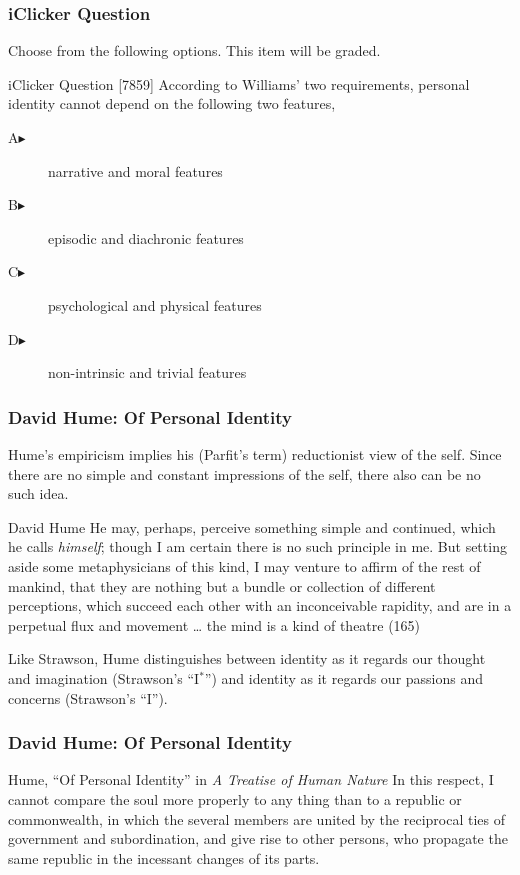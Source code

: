 \documentclass[xcolor=dvipsnames]{beamer}
\begin{document}
\begin{frame}
  \frametitle{iClicker Question}
Choose from the following options. This item will be graded.
\begin{block}{iClicker Question}
[7859] According to Williams' two requirements, personal identity
cannot depend on the following two features,
\end{block}
\begin{description}
\item[A\hspace{.2in}$\blacktriangleright$] narrative and moral features
\item[B\hspace{.2in}$\blacktriangleright$] episodic and diachronic features
\item[C\hspace{.2in}$\blacktriangleright$] psychological and physical features
\item[D\hspace{.2in}$\blacktriangleright$] non-intrinsic and trivial features
\end{description}
\end{frame}

\begin{frame}
  \frametitle{David Hume: Of Personal Identity}
  Hume's empiricism implies his (Parfit's term) reductionist view
  of the self. Since there are no simple and constant impressions
  of the self, there also can be no such idea.
  \begin{block}{David Hume}
    He may, perhaps, perceive something simple and continued,
    which he calls \emph{himself}; though I am certain there is no
    such principle in me. But setting aside some metaphysicians of
    this kind, I may venture to affirm of the rest of mankind,
    that they are nothing but a bundle or collection of different
    perceptions, which succeed each other with an inconceivable
    rapidity, and are in a perpetual flux and movement {\ldots}
    the mind is a kind of theatre (165)
  \end{block}
Like Strawson, Hume distinguishes between identity as it regards
our thought and imagination (Strawson's ``I$^{\ast}$'') and identity
as it regards our passions and concerns (Strawson's ``I''). 
\end{frame}

\begin{frame}
  \frametitle{David Hume: Of Personal Identity}
  \begin{block}{Hume, ``Of Personal Identity'' in \emph{A Treatise of Human Nature}}
    In this respect, I cannot compare the soul more properly to any
    thing than to a republic or commonwealth, in which the several
    members are united by the reciprocal ties of government and
    subordination, and give rise to other persons, who propagate the
    same republic in the incessant changes of its parts.
  \end{block}
\end{frame}
\end{document}
